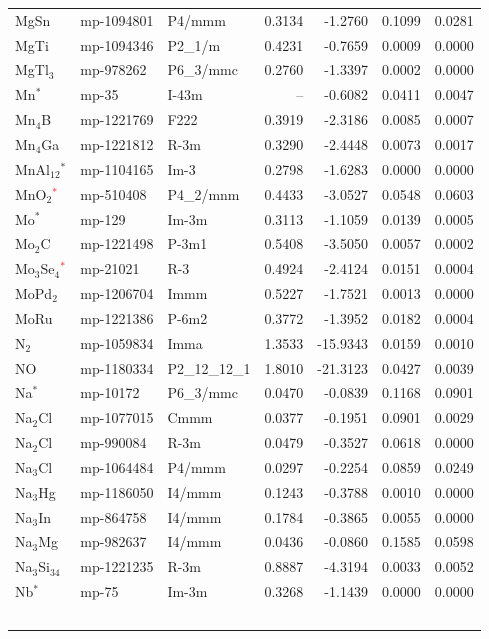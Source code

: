 \begin{longtable}{@{}lllrrrr@{}}
MgSn & mp-1094801 & P4/mmm & 0.3134 & -1.2760 & 0.1099 & 0.0281 \\
MgTi & mp-1094346 & P2\_1/m & 0.4231 & -0.7659 & 0.0009 & 0.0000 \\
MgTl$_{3}$ & mp-978262 & P6\_3/mmc & 0.2760 & -1.3397 & 0.0002 & 0.0000 \\
Mn$^*$ & mp-35 & I-43m & -- & -0.6082 & 0.0411 & 0.0047 \\
Mn$_{4}$B & mp-1221769 & F222 & 0.3919 & -2.3186 & 0.0085 & 0.0007 \\
Mn$_{4}$Ga & mp-1221812 & R-3m & 0.3290 & -2.4448 & 0.0073 & 0.0017 \\
MnAl$_{12}$$^*$ & mp-1104165 & Im-3 & 0.2798 & -1.6283 & 0.0000 & 0.0000 \\
MnO$_{2}$\textcolor{red}{$^*$} & mp-510408 & P4\_2/mnm & 0.4433 & -3.0527 & 0.0548 & 0.0603 \\
Mo$^*$ & mp-129 & Im-3m & 0.3113 & -1.1059 & 0.0139 & 0.0005 \\
Mo$_{2}$C & mp-1221498 & P-3m1 & 0.5408 & -3.5050 & 0.0057 & 0.0002 \\
Mo$_{3}$Se$_{4}$\textcolor{red}{$^*$} & mp-21021 & R-3 & 0.4924 & -2.4124 & 0.0151 & 0.0004 \\
MoPd$_{2}$ & mp-1206704 & Immm & 0.5227 & -1.7521 & 0.0013 & 0.0000 \\
MoRu & mp-1221386 & P-6m2 & 0.3772 & -1.3952 & 0.0182 & 0.0004 \\
N$_{2}$ & mp-1059834 & Imma & 1.3533 & -15.9343 & 0.0159 & 0.0010 \\
NO & mp-1180334 & P2\_12\_12\_1 & 1.8010 & -21.3123 & 0.0427 & 0.0039 \\
Na$^*$ & mp-10172 & P6\_3/mmc & 0.0470 & -0.0839 & 0.1168 & 0.0901 \\
Na$_{2}$Cl & mp-1077015 & Cmmm & 0.0377 & -0.1951 & 0.0901 & 0.0029 \\
Na$_{2}$Cl & mp-990084 & R-3m & 0.0479 & -0.3527 & 0.0618 & 0.0000 \\
Na$_{3}$Cl & mp-1064484 & P4/mmm & 0.0297 & -0.2254 & 0.0859 & 0.0249 \\
Na$_{3}$Hg & mp-1186050 & I4/mmm & 0.1243 & -0.3788 & 0.0010 & 0.0000 \\
Na$_{3}$In & mp-864758 & I4/mmm & 0.1784 & -0.3865 & 0.0055 & 0.0000 \\
Na$_{3}$Mg & mp-982637 & I4/mmm & 0.0436 & -0.0860 & 0.1585 & 0.0598 \\
Na$_{3}$Si$_{34}$ & mp-1221235 & R-3m & 0.8887 & -4.3194 & 0.0033 & 0.0052 \\
Nb$^*$ & mp-75 & Im-3m & 0.3268 & -1.1439 & 0.0000 & 0.0000 \\
$$
\end{longtable}
